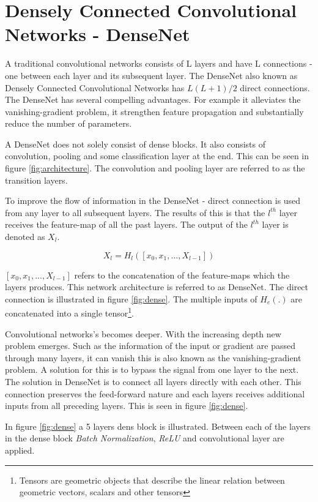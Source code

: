 \section{Densely Connected Convolutional Networks - DenseNet}

A traditional convolutional networks consists of L layers and have L connections - one between each layer and its subsequent layer. The DenseNet also known as Densely Connected Convolutional Networks has $L(L+1)/2$ direct connections. The DenseNet has several compelling advantages. For example it alleviates the vanishing-gradient problem, it strengthen feature propagation and substantially reduce the number of parameters.

A DenseNet does not solely consist of dense blocks. It also consists of convolution, pooling and some classification layer at the end. This can be seen in figure \ref{fig:architecture}. The convolution and pooling layer are referred to as the transition layers.


To improve the flow of information in the DenseNet - direct connection is used from any layer to all subsequent layers. The results of this is that the $l^{th}$ layer receives the feature-map of all the past layers. The output of the $l^{th}$ layer is denoted as $X_l$.

\begin{equation}
X_l=H_l([x_0,x_1,...,X_{l-1}])
\end{equation}

$[x_0,x_1,...,X_{l-1}]$ refers to the concatenation of the feature-maps which the layers produces. This network architecture is referred to as DenseNet. The direct connection is illustrated in figure \ref{fig:dense}. The multiple inputs of $H_e(.)$ are concatenated into a single tensor\footnote{Tensors are geometric objects that describe the linear relation between geometric vectors, scalars and other tensors}.

Convolutional networks's becomes deeper. With the increasing depth new problem emerges. Such as the information of the input or gradient are passed through many layers, it can vanish this is also known as the vanishing-gradient problem. A solution for this is to bypass the signal from one layer to the next. The solution in DenseNet is to connect all layers directly with each other. This connection preserves the feed-forward nature and each layers receives additional inputs from all preceding layers. This is seen in figure \ref{fig:dense}.


In figure \ref{fig:dense} a 5 layers dens block is illustrated. Between each of the layers in the dense block \emph{Batch Normalization}, \emph{ReLU} and convolutional layer are applied.